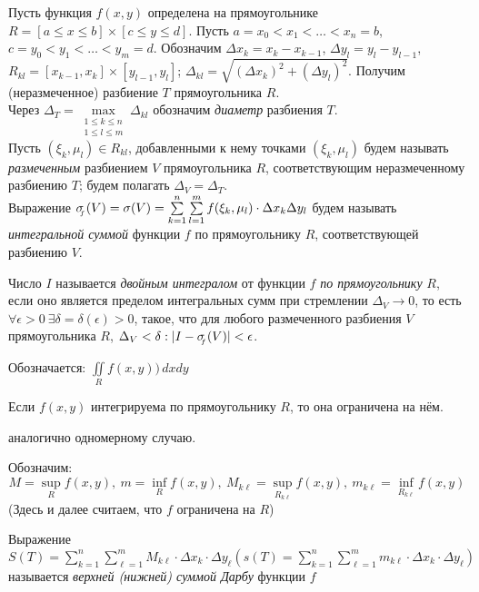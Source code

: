 \documentclass[a4paper,10pt]{article}
\begin{document}
	
	\jeolmnewheader
	
	\begin{defn}
		Пусть функция $f(x, y)$ определена на прямоугольнике \\
		$R = [a \le x \le b] \times [c \le y \le d]$. Пусть $a = x_0 < x_1 < \ldots < x_n = b$, $c = y_0 < y_1 < \ldots < y_m = d$. Обозначим $\Delta x_k = x_k - x_{k - 1}$, $\Delta y_l = y_l - y_{l - 1}$, $R_{kl} = [x_{k - 1}, x_k] \times [y_{l - 1}, y_l]$; $\Delta_{kl} = \sqrt{(\Delta x_k)^2 + (\Delta y_l)^2}$. Получим (неразмеченное) разбиение $T$ прямоугольника $R$. \\
		Через $\Delta_T = \max\limits_{\begin{smallmatrix}
			1 \le k \le n \\
			1 \le l \le m 
			\end{smallmatrix}} \Delta_{kl}$ обозначим \textit{диаметр} разбиения $T$. \\
		Пусть $(\xi_k, \mu_l) \in R_{kl}$, добавленными к нему точками $(\xi_k, \mu_l)$ будем называть \textit{размеченным} разбиением $V$ прямоугольника $R$, соответствующим неразмеченному разбиению $T$; будем полагать $\Delta_V = \Delta_T$. \\
		Выражение $\sigma_{\!\!{}_f}(V) = \sigma(V) = \sum\limits_{k = 1}^n \sum\limits_{l = 1}^m f(\xi_k, \mu_l) \cdot \Delta x_k \Delta y_l$ будем называть \textit{интегральной суммой} функции $f$ по прямоугольнику $R$, соответствующей разбиению $V$.
	\end{defn}
	
	\begin{defn}
		Число $I$ называется \textit{двойным интегралом} от функции $f$ \textit{по прямоугольнику} $R$, если оно является пределом интегральных сумм при стремлении $\Delta_V \to 0$, то есть $\forall \epsilon > 0 ~ \exists \delta = \delta(\epsilon) > 0$, такое, что для любого размеченного разбиения $V$ прямоугольника $R$, $\Delta_V <\delta : |I - \sigma_{\!\!{}_f}(V)| < \epsilon$.
		
		Обозначается: $\iint\limits_R f(x, y)) \, dxdy$
	\end{defn}
	
	\begin{prop}
		Если $f(x,y)$ интегрируема по прямоугольнику $R$, то она ограничена на нём.
	\end{prop}
	
	\begin{proof*}
		аналогично одномерному случаю.
	\end{proof*}
	
	\begin{defn}
		Обозначим: $$M = \sup\limits_R f(x, y), ~ m = \inf\limits_R f(x, y), ~ M_{k\ell} = \sup\limits_{R_{k\ell}} f(x, y), ~ m_{k\ell} = \inf\limits_{R_{k\ell}} f(x, y)$$
		(Здесь и далее считаем, что $f$ ограничена на $R$)
		
		Выражение $S(T) = \sum\limits_{k = 1}^n \sum\limits_{\ell = 1}^m M_{k\ell} \cdot \Delta x_k \cdot \Delta y_\ell \left( s(T) = \sum\limits_{k = 1}^n \sum\limits_{\ell = 1}^m m_{k\ell} \cdot \Delta x_k \cdot \Delta y_\ell \right)$ называется \textit{верхней (нижней) суммой Дарбу} функции $f$
	\end{defn}
	
\end{document}
